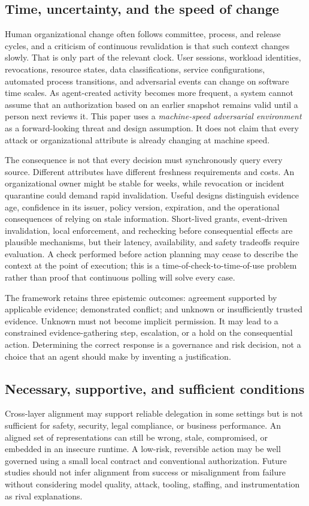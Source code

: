 \documentclass[11pt,letterpaper]{article}
\begin{document}
\subsection{Time, uncertainty, and the speed of change}
Human organizational change often follows committee, process, and release cycles, and a criticism of continuous revalidation is that such context changes slowly. That is only part of the relevant clock. User sessions, workload identities, revocations, resource states, data classifications, service configurations, automated process transitions, and adversarial events can change on software time scales. As agent-created activity becomes more frequent, a system cannot assume that an authorization based on an earlier snapshot remains valid until a person next reviews it. This paper uses a \emph{machine-speed adversarial environment} as a forward-looking threat and design assumption. It does not claim that every attack or organizational attribute is already changing at machine speed.

The consequence is not that every decision must synchronously query every source. Different attributes have different freshness requirements and costs. An organizational owner might be stable for weeks, while revocation or incident quarantine could demand rapid invalidation. Useful designs distinguish evidence age, confidence in its issuer, policy version, expiration, and the operational consequences of relying on stale information. Short-lived grants, event-driven invalidation, local enforcement, and rechecking before consequential effects are plausible mechanisms, but their latency, availability, and safety tradeoffs require evaluation. A check performed before action planning may cease to describe the context at the point of execution; this is a time-of-check-to-time-of-use problem rather than proof that continuous polling will solve every case.

The framework retains three epistemic outcomes: agreement supported by applicable evidence; demonstrated conflict; and unknown or insufficiently trusted evidence. Unknown must not become implicit permission. It may lead to a constrained evidence-gathering step, escalation, or a hold on the consequential action. Determining the correct response is a governance and risk decision, not a choice that an agent should make by inventing a justification.

\subsection{Necessary, supportive, and sufficient conditions}
Cross-layer alignment may support reliable delegation in some settings but is not sufficient for safety, security, legal compliance, or business performance. An aligned set of representations can still be wrong, stale, compromised, or embedded in an insecure runtime. A low-risk, reversible action may be well governed using a small local contract and conventional authorization. Future studies should not infer alignment from success or misalignment from failure without considering model quality, attack, tooling, staffing, and instrumentation as rival explanations.
\end{document}

